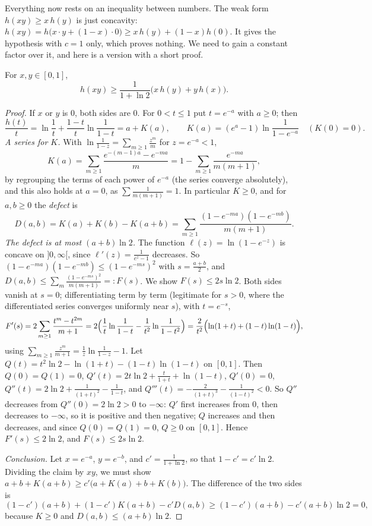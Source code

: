 Everything now rests on an inequality between numbers. The weak form $h(xy)\ge x\,h(y)$ is just concavity: $h(xy)=h\bigl(x\cdot y+(1-x)\cdot0\bigr)\ge
x\,h(y)+(1-x)h(0)$. It gives the hypothesis with $c=1$ only, which proves nothing. We need to gain a constant factor over it, and here is a version with a
short proof.

\begin{lemma}\label{conjectures:lem:hxy}
For $x,y\in[0,1]$,
\[
h(xy)\ge\frac1{1+\ln2}\bigl(x\,h(y)+y\,h(x)\bigr).
\]
\end{lemma}
\begin{proof}
If $x$ or $y$ is $0$, both sides are $0$. For $0<t\le1$ put $t=e^{-a}$ with $a\ge0$; then
\[
\frac{h(t)}t=\ln\frac1t+\frac{1-t}t\ln\frac1{1-t}=a+K(a),\qquad K(a)=(e^a-1)\ln\frac1{1-e^{-a}}\quad(K(0)=0).
\]
\emph{A series for $K$.} With $\ln\frac1{1-z}=\sum_{m\ge1}\frac{z^m}m$ for $z=e^{-a}<1$,
\[
K(a)=\sum_{m\ge1}\frac{e^{-(m-1)a}-e^{-ma}}m=1-\sum_{m\ge1}\frac{e^{-ma}}{m(m+1)},
\]
by regrouping the terms of each power of $e^{-a}$ (the series converge absolutely), and this also holds at $a=0$, as $\sum\frac1{m(m+1)}=1$. In
particular $K\ge0$, and for $a,b\ge0$ the \emph{defect} is
\[
D(a,b)=K(a)+K(b)-K(a+b)=\sum_{m\ge1}\frac{(1-e^{-ma})(1-e^{-mb})}{m(m+1)}.
\]
\emph{The defect is at most $(a+b)\ln2$.} The function $\ell(z)=\ln(1-e^{-z})$ is concave on $]0,\infty[$, since $\ell'(z)=\frac1{e^z-1}$ decreases. So
$(1-e^{-ma})(1-e^{-mb})\le(1-e^{-ms})^2$ with $s=\frac{a+b}2$, and $D(a,b)\le\sum_m\frac{(1-e^{-ms})^2}{m(m+1)}=:F(s)$. We show $F(s)\le2s\ln2$. Both sides
vanish at $s=0$; differentiating term by term (legitimate for $s>0$, where the differentiated series converges uniformly near $s$), with $t=e^{-s}$,
\[
F'(s)=2\sum_{m\ge1}\frac{t^m-t^{2m}}{m+1}=2\Bigl(\frac1t\ln\frac1{1-t}-\frac1{t^2}\ln\frac1{1-t^2}\Bigr)=\frac2{t^2}\Bigl(\ln(1+t)+(1-t)\ln(1-t)\Bigr),
\]
using $\sum_{m\ge1}\frac{z^m}{m+1}=\frac1z\ln\frac1{1-z}-1$. Let $Q(t)=t^2\ln2-\ln(1+t)-(1-t)\ln(1-t)$ on $[0,1]$. Then $Q(0)=Q(1)=0$,
$Q'(t)=2t\ln2+\frac t{1+t}+\ln(1-t)$, $Q'(0)=0$, $Q''(t)=2\ln2+\frac1{(1+t)^2}-\frac1{1-t}$, and $Q'''(t)=-\frac2{(1+t)^3}-\frac1{(1-t)^2}<0$. So $Q''$
decreases from $Q''(0)=2\ln2>0$ to $-\infty$: $Q'$ first increases from $0$, then decreases to $-\infty$, so it is positive and then negative; $Q$
increases and then decreases, and since $Q(0)=Q(1)=0$, $Q\ge0$ on $[0,1]$. Hence $F'(s)\le2\ln2$, and $F(s)\le2s\ln2$.

\emph{Conclusion.} Let $x=e^{-a}$, $y=e^{-b}$, and $c'=\frac1{1+\ln2}$, so that $1-c'=c'\ln2$. Dividing the claim by $xy$, we must show
$a+b+K(a+b)\ge c'\bigl(a+K(a)+b+K(b)\bigr)$. The difference of the two sides is
\[
(1-c')(a+b)+(1-c')K(a+b)-c'D(a,b)\ge(1-c')(a+b)-c'(a+b)\ln2=0,
\]
because $K\ge0$ and $D(a,b)\le(a+b)\ln2$.
\end{proof}

